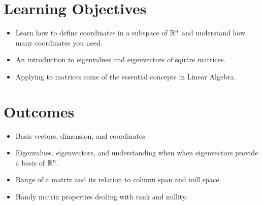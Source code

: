\section*{Learning Objectives}
\begin{itemize}
\item Learn how to define coordinates in a subspace of $\mathbb R^n$ and understand how many coordinates you need.
\item An introduction to eigenvalues and eigenvectors of square matrices.
\item Applying to matrices some of the essential concepts in Linear Algebra.
\end{itemize}

\section*{Outcomes}
\begin{itemize}
\item Basis vectors, dimension, and coordinates
\item Eigenvalues, eigenvectors, and understanding when when eigenvectors provide a basis of $\mathbb R^n$.
\item Range of a matrix and its relation to column span and null space.
\item Handy matrix properties dealing with rank and nullity.

\end{itemize}




\newpage



